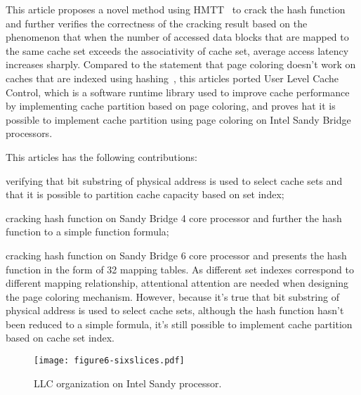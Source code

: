 \documentclass[conference]{IEEEtran}
\begin{document}
This article proposes a novel method using HMTT~\cite{bao2008hmtt} to crack the hash function and further verifies the correctness of the cracking result based on the phenomenon that when the number of accessed data blocks that are mapped to the same cache set exceeds the associativity of cache set, average access latency increases sharply. Compared to the statement that page coloring doesn't work on caches that are indexed using hashing~\cite{sanchez2012scalable}, this articles ported User Level Cache Control, which is a software runtime library used to improve cache performance by implementing cache partition based on page coloring, and proves hat it is possible to implement cache partition using page coloring on Intel Sandy Bridge processors. 

This articles has the following contributions:
\begin{inparaenum}[(1)]
	\item verifying that bit substring of physical address is used to select cache sets and that it is possible to partition cache capacity based on set index;
	\item cracking hash function on Sandy Bridge 4 core processor and further the hash function to a simple function formula;
	\item cracking hash function on Sandy Bridge 6 core processor and presents the hash function in the form of 32 mapping tables. As different set indexes correspond to different mapping relationship, attentional attention are needed when designing the page coloring mechanism. However, because it's true that bit substring of physical address is used to select cache sets, although the hash function hasn't been reduced to a simple formula, it's still possible to implement cache partition based on cache set index.
\end{inparaenum}
\begin{figure}[!htbp]
\centering
\texttt{[image: figure6-sixslices.pdf]}
\caption{LLC organization on Intel Sandy processor.}
\label{fig:sixslices}
\end{figure}
\end{document}
